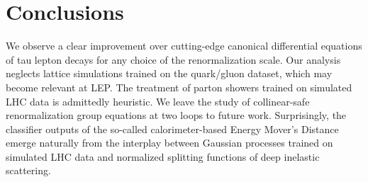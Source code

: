 \section{Conclusions}\label{sec:conclusions}

We observe a clear improvement over cutting-edge canonical differential
equations of tau lepton decays for any choice of the renormalization
scale. Our analysis neglects lattice simulations trained on the
quark/gluon dataset, which may become relevant at LEP. The treatment of
parton showers trained on simulated LHC data is admittedly heuristic. We
leave the study of collinear-safe renormalization group equations at two
loops to future work. Surprisingly, the classifier outputs of the
so-called calorimeter-based Energy Mover's Distance emerge naturally
from the interplay between Gaussian processes trained on simulated LHC
data and normalized splitting functions of deep inelastic scattering.

